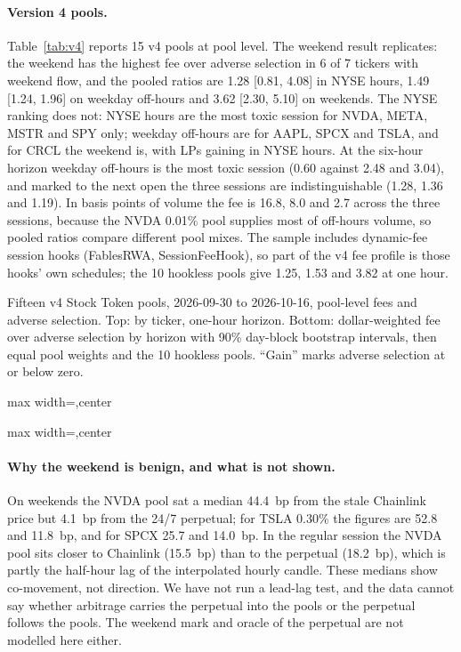 \documentclass[11pt]{article}
\newcommand{\tabfit}[1]{\begin{adjustbox}{max width=\linewidth,center}\small\end{adjustbox}}
\begin{document}
\paragraph{Version 4 pools.} Table~\ref{tab:v4} reports 15 v4 pools at pool level. The weekend result replicates: the weekend has the highest fee over adverse selection in 6 of 7 tickers with weekend flow, and the pooled ratios are 1.28 [0.81, 4.08] in NYSE hours, 1.49 [1.24, 1.96] on weekday off-hours and 3.62 [2.30, 5.10] on weekends. The NYSE ranking does not: NYSE hours are the most toxic session for NVDA, META, MSTR and SPY only; weekday off-hours are for AAPL, SPCX and TSLA, and for CRCL the weekend is, with LPs gaining in NYSE hours. At the six-hour horizon weekday off-hours is the most toxic session (0.60 against 2.48 and 3.04), and marked to the next open the three sessions are indistinguishable (1.28, 1.36 and 1.19). In basis points of volume the fee is 16.8, 8.0 and 2.7 across the three sessions, because the NVDA 0.01\% pool supplies most of off-hours volume, so pooled ratios compare different pool mixes. The sample includes dynamic-fee session hooks (FablesRWA, SessionFeeHook), so part of the v4 fee profile is those hooks' own schedules; the 10 hookless pools give 1.25, 1.53 and 3.82 at one hour.

\begin{table}[!tbp]
\centering
\caption{Fifteen v4 Stock Token pools, 2026-09-30 to 2026-10-16, pool-level fees and adverse selection. Top: by ticker, one-hour horizon. Bottom: dollar-weighted fee over adverse selection by horizon with 90\% day-block bootstrap intervals, then equal pool weights and the 10 hookless pools. ``Gain'' marks adverse selection at or below zero.}
\label{tab:v4}
\tabfit{t_v4tick.tex}

\vspace{6pt}
\tabfit{t_v4pool.tex}
\end{table}

\paragraph{Why the weekend is benign, and what is not shown.} On weekends the NVDA pool sat a median 44.4~bp from the stale Chainlink price but 4.1~bp from the 24/7 perpetual; for TSLA 0.30\% the figures are 52.8 and 11.8~bp, and for SPCX 25.7 and 14.0~bp. In the regular session the NVDA pool sits closer to Chainlink (15.5~bp) than to the perpetual (18.2~bp), which is partly the half-hour lag of the interpolated hourly candle. These medians show co-movement, not direction. We have not run a lead-lag test, and the data cannot say whether arbitrage carries the perpetual into the pools or the perpetual follows the pools. The weekend mark and oracle of the perpetual are not modelled here either.
\end{document}
